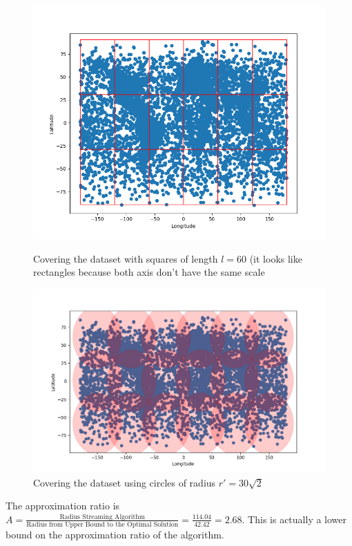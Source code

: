 \documentclass[a4paper,11pt,openany]{article}
\begin{document}
\begin{figure}[H]
\centering
\begin{minipage}{.45\textwidth}
  \begin{center}
  \includegraphics[scale=0.4]{Images/enclosing_with_squares}
  \caption{Covering the dataset with squares of length $l=60$ (it looks like rectangles because both axis don't have the same scale}
  \label{fig:enclosing_with_squares}
  \end{center}
\end{minipage}%
\hfill
\begin{minipage}{.45\textwidth}
  \begin{center}
  \includegraphics[scale=0.4]{Images/enclosing_with_circles}
  \caption{Covering the dataset using circles of radius $r'=30\sqrt{2}$}
  \label{fig:enclosing_with_circles}
  \end{center}
\end{minipage}
\end{figure}
\noindent
The approximation ratio is $A=\frac{\text{Radius Streaming Algorithm}}{\text{Radius from Upper Bound to the Optimal Solution}}=\frac{114.04}{42.42}=2.68$. This is actually a lower bound on the approximation ratio of the algorithm.
\end{document}
